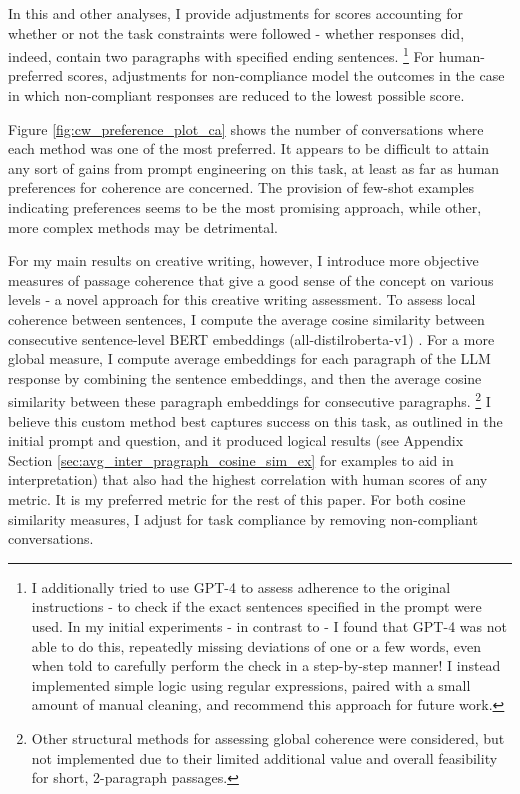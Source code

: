 \documentclass[11pt]{article}
\begin{document}
In this and other analyses, I provide adjustments for scores accounting for whether or not the task constraints were followed - whether responses did, indeed, contain two paragraphs with specified ending sentences. \footnote{I additionally tried to use GPT-4 to assess adherence to the original instructions - to check if the exact sentences specified in the prompt were used. In my initial experiments - in contrast to \citealp{yao_tree_2023} - I found that GPT-4 was not able to do this, repeatedly missing deviations of one or a few words, even when told to carefully perform the check in a step-by-step manner! I instead implemented simple logic using regular expressions, paired with a small amount of manual cleaning, and recommend this approach for future work.} For human-preferred scores, adjustments for non-compliance model the outcomes in the case in which non-compliant responses are reduced to the lowest possible score.

Figure \ref{fig:cw_preference_plot_ca} shows the number of conversations where each method was one of the most preferred. It appears to be difficult to attain any sort of gains from prompt engineering on this task, at least as far as human preferences for coherence are concerned. The provision of few-shot examples indicating preferences seems to be the most promising approach, while other, more complex methods may be detrimental.

For my main results on creative writing, however, I introduce more objective measures of passage coherence that give a good sense of the concept on various levels - a novel approach for this creative writing assessment. To assess local coherence between sentences, I compute the average cosine similarity between consecutive sentence-level BERT embeddings (all-distilroberta-v1) \cite{landauer_introduction_1998, noauthor_sentence-transformersall-distilroberta-v1_nodate}. For a more global measure, I compute average embeddings for each paragraph of the LLM response by combining the sentence embeddings, and then the average cosine similarity between these paragraph embeddings for consecutive paragraphs. \footnote{Other structural methods for assessing global coherence were considered, but not implemented due to their limited additional value and overall feasibility for short, 2-paragraph passages.} I believe this custom method best captures success on this task, as outlined in the initial prompt and question, and it produced logical results (see Appendix Section \ref{sec:avg_inter_pragraph_cosine_sim_ex} for examples to aid in interpretation) that also had the highest correlation with human scores of any metric. It is my preferred metric for the rest of this paper. For both cosine similarity measures, I adjust for task compliance by removing non-compliant conversations.
\end{document}
